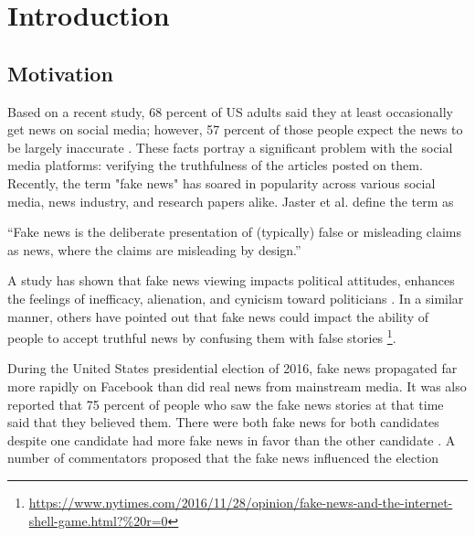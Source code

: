 \chapter{Introduction}\label{introduction}

\section{Motivation}\label{intro:motivation}
Based on a recent study, 68 percent of US adults said they at least occasionally get news on social media; however, 57 percent of those people expect the news to be largely inaccurate \cite{matsa2018news}. These facts portray a significant problem with the social media platforms: verifying the truthfulness of the articles posted on them. Recently, the term "fake news" has soared in popularity across various social media, news industry, and research papers alike. Jaster et al. define the term as \cite{gelfert2018fake}

\enquote{Fake news is the deliberate presentation of (typically) false or misleading claims as news, where the claims are misleading by design.}

\noindent
A study has shown that fake news viewing impacts political attitudes, enhances the feelings of inefficacy, alienation, and cynicism toward politicians \cite{balmas2014fake}. In a similar manner, others have pointed out that fake news could impact the ability of people to accept truthful news by confusing them with false stories \footnote{\url{https://www.nytimes.com/2016/11/28/opinion/fake-news-and-the-internet-shell-game.html?\%20r=0}}.

During the United States presidential election of 2016, fake news propagated far more rapidly on Facebook than did real news from mainstream media\cite{silverman2016analysis}. It was also reported that 75 percent of people who saw the fake news stories at that time said that they believed them\cite{silverman2016most}. There were both fake news for both candidates despite one candidate had more fake news in favor than the other candidate \cite{silverman2016analysis}. A number of commentators proposed that the fake news influenced the election  \cite{parkinson2016click, read2016donald, dewey2016facebook}

